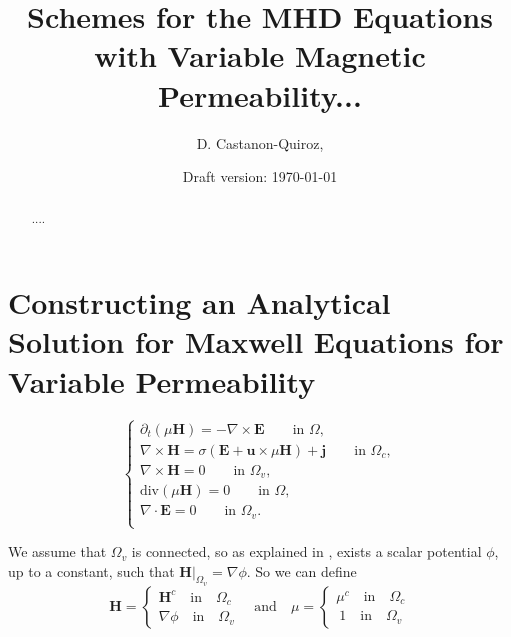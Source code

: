 \documentclass[11pt]{amsart}
\begin{document}
\title[Schemes for the MHD Equations with Variable Magnetic Permeability...]{
 Schemes for the MHD Equations with Variable Magnetic Permeability...
}

\author[D. Castanon-Quiroz]{%
D. Castanon-Quiroz,
}



\date{Draft version: \today}
  
\begin{abstract}
....
\end{abstract}

\maketitle 
 
\section{Constructing an Analytical Solution for Maxwell Equations for Variable Permeability}
\begin{equation}
\begin{cases}
\label{eq:maxwell-pde}

\partial _t (\mu \mathbf{H})  =   -\nabla \times \mathbf E \qquad \text{in } \Omega ,\\
\nabla \times \mathbf{H}  =   \sigma (\mathbf{E} + \mathbf{u} \times \mu \mathbf{H}) + \mathbf{j} \qquad \text{in } \Omega_c ,\\
\nabla \times \mathbf{H}  =   0 \qquad \text{in } \Omega_v ,\\
\text{div} (\mu \mathbf {H}) = 0  \qquad \text{in } \Omega ,\\
\nabla \cdot \mathbf{E} = 0 \qquad \text{in } \Omega_v .\\
\end{cases}
\end{equation}


\noindent We assume that $\Omega_v$ is connected, so as explained in  \cite{Guermond1}, exists
a scalar potential $\phi$, up to a constant,  such that $\mathbf{H}|_{\Omega _v}=\nabla \phi$. So we can define
$$ 
\mathbf{H}=\begin{cases} \mathbf{H} ^c \quad \text{in} \quad \Omega_c \\ \nabla \phi \quad \text{in} \quad  \Omega_v\end{cases}
\quad \text{and} \quad
\mu =\begin{cases} \mu ^c \quad \text{in} \quad \Omega_c \\ \ 1 \quad \text{in} \quad  \Omega_v\end{cases}
$$
\end{document}
